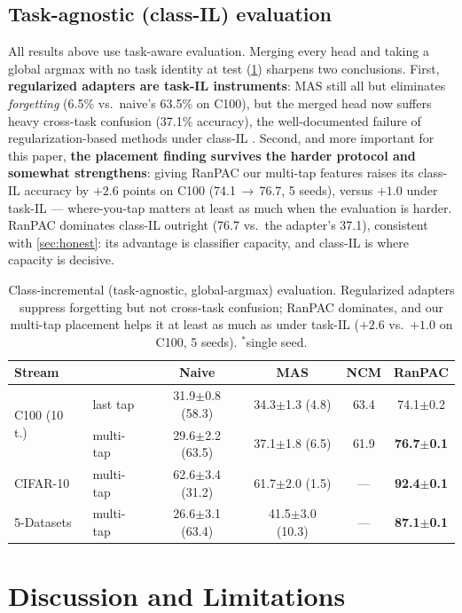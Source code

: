 \documentclass{article} %
\newcommand{\best}[1]{\textbf{#1}}
\begin{document}
\subsection{Task-agnostic (class-IL) evaluation}
\label{sec:classil}
All results above use task-aware evaluation. Merging every head and taking a
global argmax with no task identity at test (\cref{tab:classil}) sharpens two
conclusions. First, \textbf{regularized adapters are task-IL instruments}: MAS
still all but eliminates \emph{forgetting} (6.5\% vs.\ naive's 63.5\% on
C100), but the merged head now suffers heavy cross-task confusion (37.1\%
accuracy), the well-documented failure of regularization-based methods under
class-IL \citep{vandeven2022three}. Second, and more important for this paper,
\textbf{the placement finding survives the harder protocol and somewhat
strengthens}: giving RanPAC our multi-tap features raises its class-IL accuracy
by $+2.6$ points on C100 (74.1\,$\to$\,76.7, 5 seeds), versus $+1.0$ under
task-IL --- where-you-tap matters at least as much when the evaluation is
harder. RanPAC dominates class-IL outright (76.7 vs.\ the adapter's 37.1),
consistent with \cref{sec:honest}: its advantage is classifier capacity, and
class-IL is where capacity is decisive.

\begin{table}[t]
\centering\small
\caption{Class-incremental (task-agnostic, global-argmax) evaluation.
Regularized adapters suppress forgetting but not cross-task confusion; RanPAC
dominates, and our multi-tap placement helps it at least as much as under
task-IL ($+2.6$ vs.\ $+1.0$ on C100, 5 seeds). $^*$single seed.}
\label{tab:classil}
\begin{tabular}{llcccc}
\toprule
Stream & & Naive & MAS & NCM & RanPAC \\
\midrule
\multirow{2}{*}{C100 (10 t.)}
 & last tap & 31.9$\pm$0.8 (58.3) & 34.3$\pm$1.3 (4.8) & 63.4 & 74.1$\pm$0.2 \\
 & multi-tap & 29.6$\pm$2.2 (63.5) & 37.1$\pm$1.8 (6.5) & 61.9 & \best{76.7$\pm$0.1} \\
\midrule
CIFAR-10 & multi-tap & 62.6$\pm$3.4 (31.2) & 61.7$\pm$2.0 (1.5) & --- & \best{92.4$\pm$0.1} \\
5-Datasets & multi-tap & 26.6$\pm$3.1 (63.4) & 41.5$\pm$3.0 (10.3) & --- & \best{87.1$\pm$0.1} \\
\bottomrule
\end{tabular}
\end{table}

\section{Discussion and Limitations}
\label{sec:limits}
\end{document}
